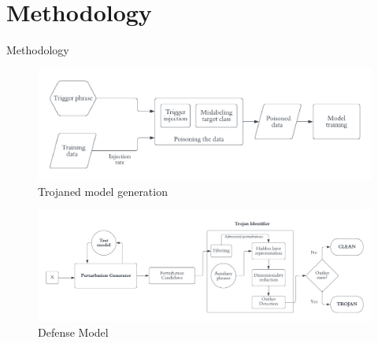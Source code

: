 \section{Methodology}
\begin{frame}[allowframebreaks]{Methodology}

\begin{figure}[H]
    \centering
    \includegraphics[width=\textwidth]{images/attack-model.pdf}
    \caption{Trojaned model generation}
    \label{fig:attack-model}
\end{figure}



\framebreak

\begin{figure}[H]
    \centering
    \includegraphics[width=\textwidth]{images/defender-model.pdf}
    \caption{Defense Model \cite{azizi2021tminer}}
    \label{fig:defender-model}
\end{figure}


\end{frame}
